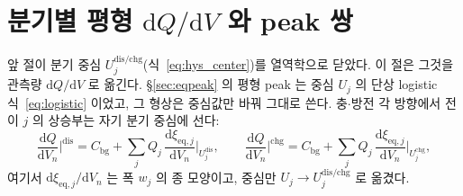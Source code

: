 \documentclass[11pt,a4paper]{article}
\newcommand{\dd}{\mathrm{d}}
\newcommand{\eq}{\mathrm{eq}}
\newcommand{\bg}{\mathrm{bg}}
\newcommand{\dis}{\mathrm{dis}}
\newcommand{\chg}{\mathrm{chg}}
\begin{document}
\section{분기별 평형 $\dd Q/\dd V$ 와 peak 쌍}\label{sec:hys_peak}
앞 절이 분기 중심 $U_j^{\dis/\chg}$(식~\eqref{eq:hys_center})를 열역학으로 닫았다. 이 절은 그것을 관측량
$\dd Q/\dd V$ 로 옮긴다. \S\ref{sec:eqpeak} 의 평형 peak 는 중심 $U_j$ 의 단상 logistic
식~\eqref{eq:logistic} 이었고, 그 형상은 중심값만 바꿔 그대로 쓴다. 충$\cdot$방전 각 방향에서 전이 $j$ 의
상승부는 자기 분기 중심에 선다:
\begin{equation}
\frac{\dd Q}{\dd V_n}\Big|^{\dis}=C_\bg+\sum_j Q_j\,\frac{\dd\xi_{\eq,j}}{\dd V_n}\Big|_{U_j^\dis},\qquad
\frac{\dd Q}{\dd V_n}\Big|^{\chg}=C_\bg+\sum_j Q_j\,\frac{\dd\xi_{\eq,j}}{\dd V_n}\Big|_{U_j^\chg},
\label{eq:hys_dQdV}
\end{equation}
여기서 $\dd\xi_{\eq,j}/\dd V_n$ 는 폭 $w_j$ 의 종 모양이고, 중심만 $U_j\to U_j^{\dis/\chg}$ 로 옮겼다.
\end{document}
